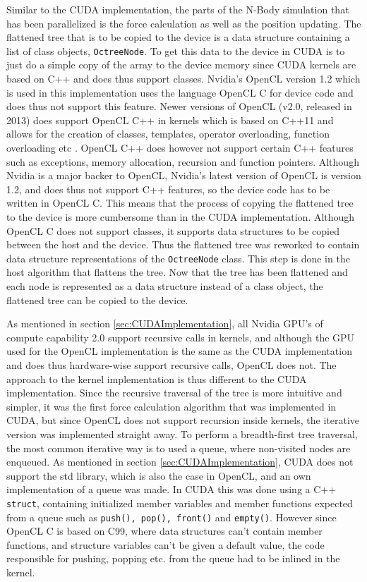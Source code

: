 Similar to the CUDA implementation, the parts of the N-Body simulation that has been parallelized is the force calculation as well as the position updating. The flattened tree that is to be copied to the device is a data structure containing a list of class objects, \lstinline{OctreeNode}. To get this data to the device in CUDA is to just do a simple copy of the array to the device memory since CUDA kernels are based on C++ and does thus support classes. Nvidia's OpenCL version 1.2 which is used in this implementation uses the language OpenCL C for device code and does thus not support this feature. Newer versions of OpenCL (v2.0, released in 2013) does support OpenCL C++ in kernels which is based on C++11 and allows for the creation of classes, templates, operator overloading, function overloading etc \cite{OpenCLC++Introduction}. OpenCL C++ does however not support certain C++ features such as exceptions, memory allocation, recursion and function pointers. Although Nvidia is a major backer to OpenCL, Nvidia's latest version of OpenCL is version 1.2, and does thus not support C++ features, so the device code has to be written in OpenCL C. This means that the process of copying the flattened tree to the device is more cumbersome than in the CUDA implementation. Although OpenCL C does not support classes, it supports data structures to be copied between the host and the device. Thus the flattened tree was reworked to contain data structure representations of the \lstinline{OctreeNode} class. This step is done in the host algorithm that flattens the tree. Now that the tree has been flattened and each node is represented as a data structure instead of a class object, the flattened tree can be copied to the device.

As mentioned in section \ref{sec:CUDAImplementation}, all Nvidia GPU's of compute capability 2.0 support recursive calls in kernels, and although the GPU used for the OpenCL implementation is the same as the CUDA implementation and does thus hardware-wise support recursive calls, OpenCL does not. The approach to the kernel implementation is thus different to the CUDA implementation. Since the recursive traversal of the tree is more intuitive and simpler, it was the first force calculation algorithm that was implemented in CUDA, but since OpenCL does not support recursion inside kernels, the iterative version was implemented straight away. To perform a breadth-first tree traversal, the most common iterative way is to used a queue, where non-visited nodes are enqueued. As mentioned in section \ref{sec:CUDAImplementation}, CUDA does not support the std library, which is also the case in OpenCL, and an own implementation of a queue was made. In CUDA this was done using a C++ \lstinline{struct}, containing initialized member variables and member functions expected from a queue such as \lstinline{push(), pop(), front()} and \lstinline{empty()}. However since OpenCL C is based on C99, where data structures can't contain member functions, and structure variables can't be given a default value, the code responsible for pushing, popping etc. from the queue had to be inlined in the kernel.


